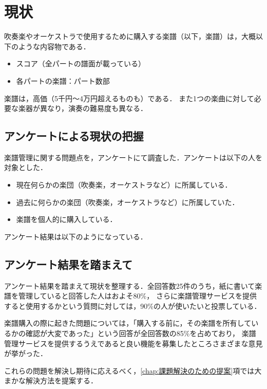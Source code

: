 \chapter{現状}
吹奏楽やオーケストラで使用するために購入する楽譜（以下，楽譜）は，大概以下のような内容物である．
\begin{itemize}
    \item スコア（全パートの譜面が載っている）
    \item 各パートの楽譜：パート数部
\end{itemize}
楽譜は，高価（5千円〜4万円超えるものも）である．
また1つの楽曲に対して必要な楽器が異なり，演奏の難易度も異なる．
\section{アンケートによる現状の把握}
楽譜管理に関する問題点を，アンケートにて調査した．アンケートは以下の人を対象とした．
\begin{itemize}
    \item 現在何らかの楽団（吹奏楽，オーケストラなど）に所属している．
    \item 過去に何らかの楽団（吹奏楽，オーケストラなど）に所属していた．
    \item 楽譜を個人的に購入している．
\end{itemize}
アンケート結果は以下のようになっている．

\section{アンケート結果を踏まえて}\label{chap:issues}
アンケート結果を踏まえて現状を整理する．全回答数25件のうち，紙に書いて楽譜を管理していると回答した人はおよそ80\%，
さらに楽譜管理サービスを提供すると使用するかという質問に対しては，90\%の人が使いたいと投票している．\par
楽譜購入の際に起きた問題については，「購入する前に，その楽譜を所有しているかの確認が{{大変}}であった」という回答が全回答数の85\%を占めており，
楽譜管理サービスを提供するうえであると良い機能を募集したところさまざまな意見が挙がった．\par
これらの問題を解決し期待に応えるべく，\ref{chap:課題解決のための提案}項では大まかな解決方法を提案する．